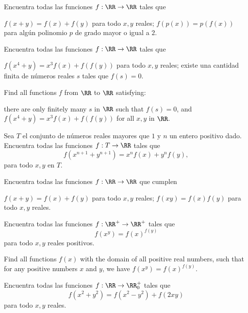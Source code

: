 \begin{problem}
	Encuentra todas las funciones $f:\RR\to\RR$ tales que
	\begin{enumerate}[(i)]
		\ii $f(x+y)=f(x)+f(y)$ para todo $x,y$ reales;
		\ii $f(p(x))=p(f(x))$ para algún polinomio $p$ de grado mayor o igual a $2$.
	\end{enumerate}
\end{problem}

\begin{problem}[APMO 2002/5]
	Encuentra todas las funciones $f:\RR\to\RR$ tales que
	\begin{enumerate}[(i)]
		\ii $f(x^4+y)=x^3f(x)+f(f(y))$ para todo $x,y$ reales;
		\ii existe una cantidad finita de números reales $s$ tales que $f(s)=0$.
	\end{enumerate}
	\begin{hint}
		Find all functions $f$ from $\RR$ to $\RR$ satisfying:
		\begin{enumerate}[(i)]
			\ii there are only finitely many $s$ in $\RR$ such that $f(s)=0$, and
			\ii $f(x^4+y)=x^3f(x)+f(f(y))$ for all $x,y$ in $\RR$.
		\end{enumerate}
	\end{hint}
\end{problem}

\begin{problem}
	Sea $T$ el conjunto de números reales mayores que $1$ y $n$ un entero positivo dado. Encuentra todas las funciones $f:T\to\RR$ tales que
	\[f(x^{n+1}+y^{n+1})=x^nf(x)+y^nf(y),\]
	para todo $x,y$ en $T$.
\end{problem}

\begin{problem}
	Encuentra todas las funciones $f:\RR\to\RR$ que cumplen
	\begin{enumerate}[(i)]
		\ii $f(x+y)=f(x)+f(y)$ para todo $x,y$ reales;
		\ii $f(xy)=f(x)f(y)$ para todo $x,y$ reales.
	\end{enumerate}
\end{problem}

\begin{problem}
	Encuentra todas las funciones $f:\RR^+\to\RR^+$ tales que
	\[f(x^y)=f(x)^{f(y)}\]
	para todo $x,y$ reales positivos.
	\forum[aops]{2356852}
	\begin{hint}
		Find all functions $f(x)$ with the domain of all positive real numbers, such that for any positive numbers $x$ and $y$, we have $f(x^y)=f(x)^{f(y)}$.
	\end{hint}
\end{problem}

\begin{problem}
	Encuentra todas las funciones $f:\RR\to\RR^+_0$ tales que
	\[f(x^2+y^2)=f(x^2-y^2)+f(2xy)\]
	para todo $x,y$ reales.
\end{problem}
